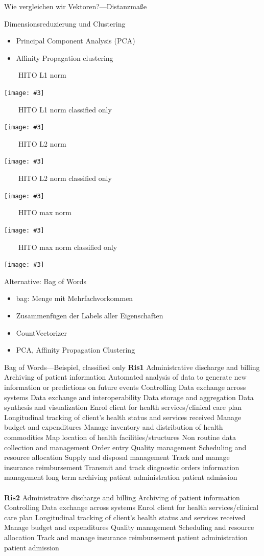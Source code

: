 \documentclass[aspectratio=1610,handout]{beamer}
\newcommand{\imageslide}[4][]
{
\begin{frame}[plain]{~~~~#2}
\vspace{0.2em}
\begin{center}
\centering\texttt{[image: \#3]}
\end{center}
#1
\note{#4}
\end{frame}
}
\begin{document}
\begin{frame}{Wie vergleichen wir Vektoren?---Distanzmaße}
\end{frame}

\begin{frame}{Dimensionsreduzierung und Clustering}
\begin{itemize}
\item Principal Component Analysis (PCA)
\item Affinity Propagation clustering
\end{itemize}
\end{frame}

\imageslide{HITO L1 norm}{img/cluster-l1.pdf}{}
\imageslide{HITO L1 norm classified only}{img/cluster-classifiedonly-l1.pdf}{}
\imageslide{HITO L2 norm}{img/cluster-l2.pdf}{}
\imageslide{HITO L2 norm classified only}{img/cluster-classifiedonly-l2.pdf}{}
\imageslide{HITO max norm}{img/cluster-max.pdf}{}
\imageslide{HITO max norm classified only}{img/cluster-classifiedonly-max.pdf}{}


\begin{frame}{Alternative: Bag of Words}
\begin{itemize}
\item bag: Menge mit Mehrfachvorkommen
\item Zusammenfügen der Labels aller Eigenschaften
\item CountVectorizer
\item PCA, Affinity Propagation Clustering
\end{itemize}
\end{frame}

\begin{frame}{Bag of Words---Beispiel, classified only}
\small
\textbf{Ris1} Administrative discharge and billing Archiving of patient information Automated analysis of data to generate new information or predictions on future events Controlling Data exchange across systems Data exchange and interoperability Data storage and aggregation Data synthesis and visualization Enrol client for health services/clinical care plan Longitudinal tracking of client’s health status and services received Manage budget and expenditures Manage inventory and distribution of health commodities Map location of health facilities/structures Non routine data collection and management Order entry Quality management Scheduling and resource allocation Supply and disposal management Track and manage insurance reimbursement Transmit and track diagnostic orders information management long term archiving patient administration patient admission
\\~\\
\textbf{Ris2} Administrative discharge and billing Archiving of patient information Controlling Data exchange across systems Enrol client for health services/clinical care plan Longitudinal tracking of client’s health status and services received Manage budget and expenditures Quality management Scheduling and resource allocation Track and manage insurance reimbursement patient administration patient admission
\end{frame}
\end{document}
